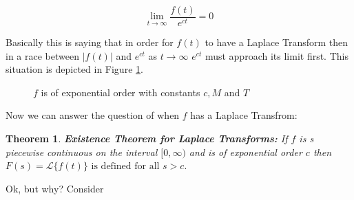 \documentclass{article}
\newtheorem{thm}{Theorem}[section]
\theoremstyle{definition}
\begin{document}
\bigskip
\begin{equation*}
\lim\limits_{t \to \infty} \frac{f(t)}{e^{ct}} = 0
\end{equation*}

\medskip
\bigskip
\noindent
Basically this is saying that in order for $f(t)$ to have a Laplace Transform then in a race between $|f(t)|$ and $e^{ct}$ as $t \to \infty$ $e^{ct}$ must
approach its limit first. This situation is depicted in Figure \ref{fig:exponential_order}.

\bigskip
\bigskip
\begin{figure}[H]
\caption{$f$ is of exponential order with constants $c, M$ and $T$}
\label{fig:exponential_order}
\end{figure}

\bigskip
\bigskip
\noindent
Now we can answer the question of when $f$ has a Laplace Transfrom:

\bigskip
\begin{thm} 
{\bf Existence Theorem for Laplace Transforms:} \normalfont If $f$ is s piecewise continuous on the interval $[0,\infty)$ and is of exponential order $c$ then 
$F (s) = \mathcal{L}\{f (t)\} \text{ is defined for all $s > c$}.$
\end{thm}

\bigskip
\noindent
Ok, but why? Consider
\end{document}

